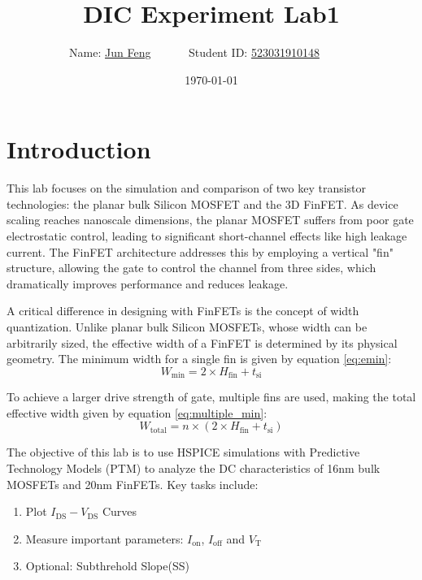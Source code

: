 \documentclass[UTF8,12pt,a4paper]{article}
\title{DIC Experiment Lab1}
\author{
	Name: \underline{Jun Feng}~~~~~~
	Student ID: \underline{523031910148}~~~~~~}
\date{\today}
\begin{document}
\fancyfoot[C]{\thepage}

\maketitle
\tableofcontents

\newpage
\section{Introduction}
This lab focuses on the simulation and comparison of two key transistor technologies: the planar bulk Silicon MOSFET and the 3D FinFET. As device scaling reaches nanoscale dimensions, the planar MOSFET suffers from poor gate electrostatic control, leading to significant short-channel effects like high leakage current. The FinFET architecture addresses this by employing a vertical "fin" structure, allowing the gate to control the channel from three sides, which dramatically improves performance and reduces leakage.

A critical difference in designing with FinFETs is the concept of width quantization. Unlike planar bulk Silicon MOSFETs, whose width can be arbitrarily sized, the effective width of a FinFET is determined by its physical geometry. The minimum width for a single fin is given by equation \eqref{eq:emin}:
\begin{equation}
	\label{eq:emin}
    W_{\text{min}} = 2 \times H_{\text{fin}} + t_{\text{si}}
\end{equation}

To achieve a larger drive strength of gate, multiple fins are used, making the total effective width given by equation  \eqref{eq:multiple_min}:
\begin{equation}
	\label{eq:multiple_min}
 	W_{\text{total}} = n \times (2 \times H_{\text{fin}} + t_{\text{si}})
\end{equation}

The objective of this lab is to use HSPICE simulations with Predictive Technology Models (PTM) to analyze the DC characteristics of 16nm bulk MOSFETs and 20nm FinFETs. Key tasks include:
\begin{enumerate}
	\item Plot $I_{\text{DS}}-V_{\text{DS}}$ Curves
	\item Measure important parameters: $I_{\text{on}}$, $I_{\text{off}}$ and $V_{\text{T}}$
	\item Optional: Subthrehold Slope(SS)
\end{enumerate}
\end{document}

